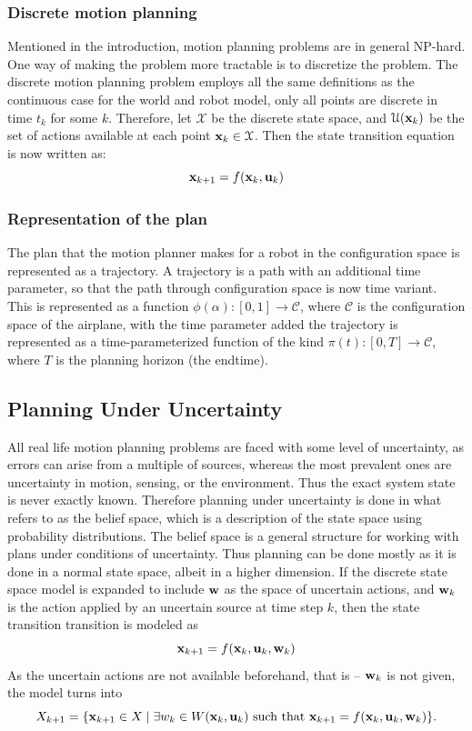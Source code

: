 \subsubsection{Discrete motion planning}

Mentioned in the introduction, motion planning problems are in general NP-hard.
One way of making the problem more tractable is to discretize the problem. The
discrete motion planning problem employs all the same definitions as the
continuous case for the world and robot model, only all points are discrete in
time \(t_k\) for some \(k\). Therefore, let \(\mathcal{X}\) be the discrete
state space, and \(\mathcal{U}(\mathbf{x}_k)\) be the set of actions available at
each point \(\mathbf{x}_k \in \mathcal{X}\). Then the state transition equation is
now written as:
\[
  \mathbf{x}_{k+1} = f(\mathbf{x}_k, \mathbf{u}_k)
\]

\subsubsection{Representation of the plan}

The plan that the motion planner makes for a robot in the configuration space is
represented as a trajectory. A trajectory is a path with an additional time
parameter, so that the path through configuration space is now time variant.
This is represented as a function \(\phi(\alpha) \colon [0,1] \rightarrow
\mathcal{C}\), where \(\mathcal{C}\) is the configuration space of the airplane,
with the time parameter added the trajectory is represented as a
time-parameterized function of the kind \(\pi(t) \colon [0,T] \rightarrow
\mathcal{C}\), where \(T\) is the planning horizon (\ie the endtime).

\subsection{Planning Under Uncertainty}

All real life motion planning problems are faced with some level of uncertainty,
as errors can arise from a multiple of sources, whereas the most prevalent ones
are uncertainty in motion, sensing, or the environment. Thus the exact system
state is never exactly known. Therefore planning under uncertainty is done in
what~\citeauthor[LaValle]{Lav06} refers to as the belief space, which is a
description of the state space using probability distributions. The belief space
is a general structure for working with plans under conditions of uncertainty.
Thus planning can be done mostly as it is done in a normal state space, albeit
in a higher dimension. If the discrete state space model is expanded to include
\(\mathbf{w}\) as the space of uncertain actions, and \(\mathbf{w}_k\) is the action
applied by an uncertain source at time step \(k\), then the state transition
transition is modeled as
\[
  \mathbf{x}_{k+1} = f(\mathbf{x}_k,\mathbf{u}_k,\mathbf{w}_k)
\]
As the uncertain actions are not available beforehand, that is -- \(\mathbf{w}_
k\) is not given, the model turns into~\cite{Lav06}
\[
  X_{k+1} = \lbrace \mathbf{x}_{k+1} \in X \mid \exists w_k \in
    W(\mathbf{x}_k,\mathbf{u}_k) \text{ such that } \mathbf{x}_{k+1} =
    f(\mathbf{x}_k,\mathbf{u}_k,\mathbf{w}_k)\rbrace.
\] 

